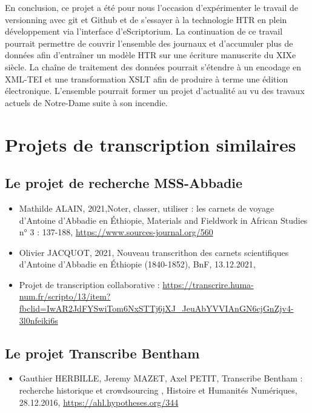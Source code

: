 \documentclass{article}
\begin{document}
En conclusion, ce projet a été pour nous l’occasion d’expérimenter le travail de versionning avec git et Github et de s’essayer à la technologie HTR en plein développement via l’interface d’eScriptorium. La continuation de ce travail pourrait permettre de couvrir l’ensemble des journaux et d’accumuler plus de données afin d’entraîner un modèle HTR sur une écriture manuscrite du XIXe siècle. La chaîne de traitement des données pourrait s’étendre à un encodage en XML-TEI et une transformation XSLT afin de produire à terme une édition électronique. L’ensemble pourrait former un projet d’actualité au vu des travaux actuels de Notre-Dame suite à son incendie.




\section*{Projets de transcription similaires}


\subsection*{Le projet de recherche MSS-Abbadie}

\begin{itemize}
\item Mathilde ALAIN, 2021,\og Noter, classer, utiliser : les carnets de voyage d’Antoine d’Abbadie en Éthiopie\fg, Materials and Fieldwork in African Studies n° 3 : 137-188, 
\url{https://www.sources-journal.org/560}

\item Olivier JACQUOT, 2021, \og Nouveau transcrithon des carnets scientifiques d’Antoine d’Abbadie en Éthiopie (1840-1852)\fg, BnF, 13.12.2021, 

\item Projet de transcription collaborative : \url{https://transcrire.huma-num.fr/scripto/13/item?fbclid=IwAR2JdFYSwiTom6NxSTTj6jXJ_JeuAbYVVIAnGN6cjGnZjv4-3l0nfeiki6s}


\end{itemize}




\subsection*{Le projet Transcribe Bentham}

\begin{itemize}
\item Gauthier HERBILLE, Jeremy MAZET, Axel PETIT, \og Transcribe Bentham : recherche historique et crowdsourcing \fg,  Histoire et Humanités Numériques, 28.12.2016, \url{https://ahl.hypotheses.org/344}




\end{itemize}
\end{document}
